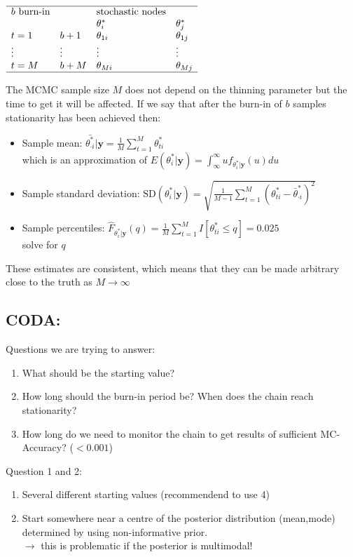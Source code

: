 \documentclass{article}\usepackage[]{graphicx}\usepackage[]{xcolor}
\begin{document}
\begin{multicols*}{2}
\begin{center}
$\begin{array}{llll}
\hline
b\text{ burn-in} & &\text{stochastic nodes} & \\
&         & \theta_i^*  & \theta_j^*  \\
t=1 & b+1 & \theta_{1i} & \theta_{1j}  \\
\vdots    & \vdots& \vdots & \vdots  \\
t=M & b+M & \theta_{Mi} & \theta_{Mj}  \\
\hline
\end{array}$
\end{center}
The MCMC sample size $M$ does not depend on the thinning parameter but the time to get it will be affected. If we say that after the burn-in of $b$ samples stationarity has been achieved then:
\begin{itemize}
\item Sample mean: $\boxed{\bar{\theta_{\cdot i}^*}|\boldsymbol{y}=\frac{1}{M}\sum_{t=1}^{M}\theta_{ti}^*}$ 
\\which is an approximation of $E(\theta_{i}^*|\boldsymbol{y})=\int_{\infty}^{\infty}uf_{\theta_{i}^*|\boldsymbol{y}}(u)du$
\item Sample standard deviation: $\boxed{\text{SD}(\theta_{i}^*|\boldsymbol{y})=\sqrt{\frac{1}{M-1}\sum_{t=1}^{M}(\theta_{ti}^*-\bar{\theta}_{\cdot i}^*)^2}}$
\item Sample percentiles: $\boxed{\hat{F}_{\theta_{i}^*|\boldsymbol{y}}(q)=\frac{1}{M}\sum_{t=1}^{M}I[\theta_{ti}^*\leq q]=0.025}$\\solve for $q$
\end{itemize}
These estimates are consistent, which means that they can be made arbitrary close to the truth as $M\rightarrow\infty$

\subsection{CODA:}
Questions we are trying to answer:
\begin{enumerate}
\item What should be the starting value? 
\item How long should the burn-in period be? When does the chain reach stationarity?
\item How long do we need to monitor the chain to get results of sufficient MC-Accuracy? ($<0.001$)
\end{enumerate}

Question 1 and 2:
\begin{enumerate}
\item Several different starting values (recommendend to use 4)
\item Start somewhere near a centre of the posterior distribution (mean,mode) determined by using non-informative prior.\\
      $\rightarrow$ this is problematic if the posterior is multimodal! 
\end{enumerate}


\end{multicols*}
\end{document}
